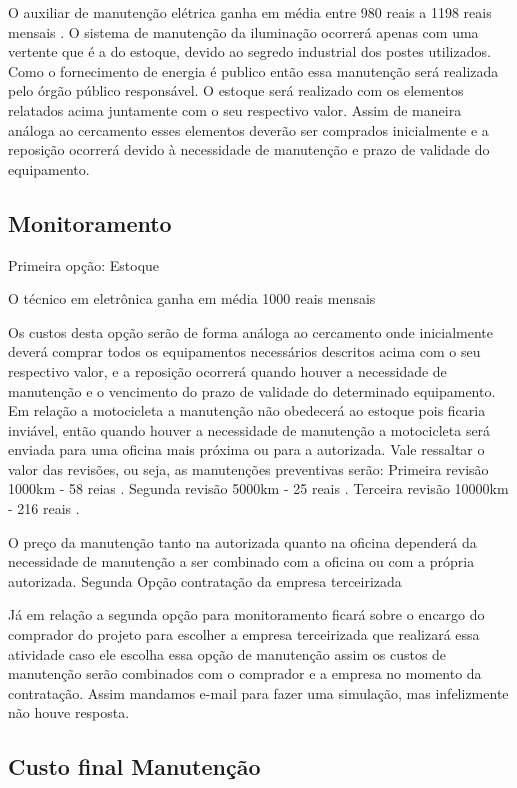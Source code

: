 O auxiliar de manutenção elétrica ganha em média entre 980 reais a 1198 reais mensais \cite{catho} .
O sistema de manutenção da iluminação ocorrerá apenas com uma vertente que é a do estoque, devido ao segredo industrial dos postes utilizados. Como o fornecimento de energia é publico então essa manutenção será realizada pelo órgão público responsável.  O estoque será realizado com os elementos relatados acima juntamente com o seu respectivo valor. Assim de maneira análoga ao cercamento esses elementos deverão ser comprados inicialmente e a reposição ocorrerá devido à necessidade de manutenção e prazo de validade do equipamento.
\subsection{Monitoramento}

Primeira opção: Estoque

O técnico em eletrônica ganha em média 1000 reais mensais

Os custos desta opção serão de forma análoga ao cercamento onde inicialmente deverá comprar todos os equipamentos necessários descritos acima com o seu respectivo valor, e a reposição ocorrerá quando houver a necessidade de manutenção e o vencimento do prazo de validade do determinado equipamento.
Em relação a motocicleta a manutenção não obedecerá ao estoque pois ficaria inviável, então quando houver a necessidade de manutenção a motocicleta será enviada para uma oficina mais próxima ou para a autorizada. Vale ressaltar o valor das revisões, ou seja, as manutenções preventivas serão:
Primeira revisão 1000km - 58 reias \cite{yamaha} .
Segunda revisão 5000km - 25 reais \cite{yamaha} .
Terceira revisão 10000km - 216 reais \cite{yamaha} .

O preço da manutenção tanto na autorizada quanto na oficina dependerá da necessidade de manutenção a ser combinado com a oficina ou com a própria autorizada.
Segunda Opção contratação da empresa terceirizada

Já em relação a segunda opção para monitoramento ficará sobre o encargo do comprador do projeto para escolher a empresa terceirizada que realizará essa atividade caso ele escolha essa opção de manutenção assim os custos de manutenção serão combinados com o comprador e a empresa no momento da contratação. Assim mandamos e-mail para fazer uma simulação, mas infelizmente não houve resposta.
\subsection{Custo final Manutenção}

